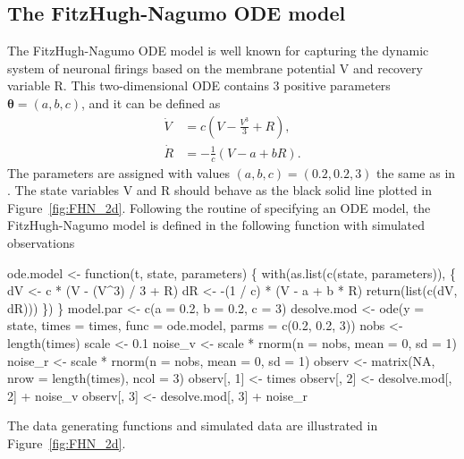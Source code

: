 \subsection{The FitzHugh-Nagumo ODE model}
The FitzHugh-Nagumo ODE model is well known for capturing the dynamic system of neuronal firings based on the membrane potential V and recovery variable R. This two-dimensional ODE contains 3 positive parameters $\bm{\theta} = (a,b,c)$, and it can be defined as
\begin{align*}
\dot{V} &= c(V - \frac{V^{3}}{3} + R),  \\
\dot{R} &= -\frac{1}{c}(V - a + bR).
\end{align*}
The parameters are assigned with values $(a,b,c) = (0.2,0.2,3)$ the same as in \cite{parcascade}. The state variables V and R should behave as the black solid line plotted in Figure~\ref{fig:FHN_2d}. Following the routine of specifying an ODE model, the FitzHugh-Nagumo model is defined in the following function with simulated observations
\begin{example*}
ode.model <- function(t, state, parameters) \{
  with(as.list(c(state, parameters)), \{
    dV <- c * (V - (V^3) / 3 + R)
    dR <- -(1 / c) * (V - a + b * R)
    return(list(c(dV, dR)))
  \})
\}
model.par   <- c(a = 0.2, b = 0.2, c = 3)
desolve.mod <- ode(y = state, times = times, func = ode.model, parms = c(0.2, 0.2, 3))
nobs    <- length(times)
scale   <- 0.1
noise_v <- scale * rnorm(n = nobs, mean = 0, sd = 1)
noise_r <- scale * rnorm(n = nobs, mean = 0, sd = 1)
observ  <- matrix(NA, nrow = length(times), ncol = 3)
observ[, 1] <- times
observ[, 2] <- desolve.mod[, 2] + noise_v
observ[, 3] <- desolve.mod[, 3] + noise_r
\end{example*} 
The data generating functions and simulated data are illustrated in Figure~\ref{fig:FHN_2d}. 
